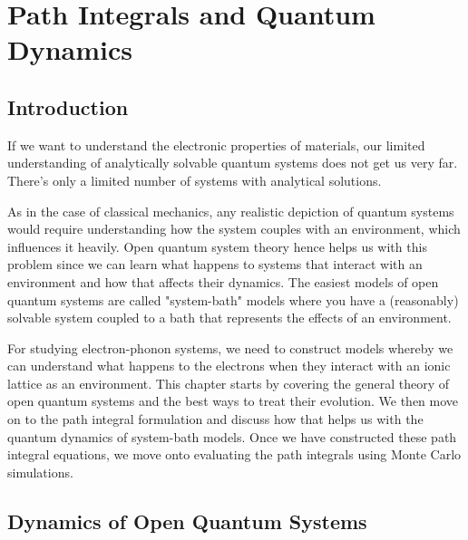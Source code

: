
\chapter{Path Integrals and Quantum Dynamics} %

\label{Chapter4} %



\section{Introduction}

If we want to understand the electronic properties of materials, our limited understanding of analytically solvable quantum systems does not get us very far. There's only a limited number of systems with analytical solutions.

As in the case of classical mechanics, any realistic depiction of quantum systems would require understanding how the system couples with an environment, which influences it heavily. Open quantum system theory hence helps us with this problem since we can learn what happens to systems that interact with an environment and how that affects their dynamics. The easiest models of open quantum systems are called "system-bath" models where you have a (reasonably) solvable system coupled to a bath that represents the effects of an environment.

For studying electron-phonon systems, we need to construct models whereby we can understand what happens to the electrons when they interact with an ionic lattice as an environment. This chapter starts by covering the general theory of open quantum systems and the best ways to treat their evolution. We then move on to the path integral formulation and discuss how that helps us with the quantum dynamics of system-bath models. Once we have constructed these path integral equations, we move onto evaluating the path integrals using Monte Carlo simulations. 


\section{Dynamics of Open Quantum Systems}

